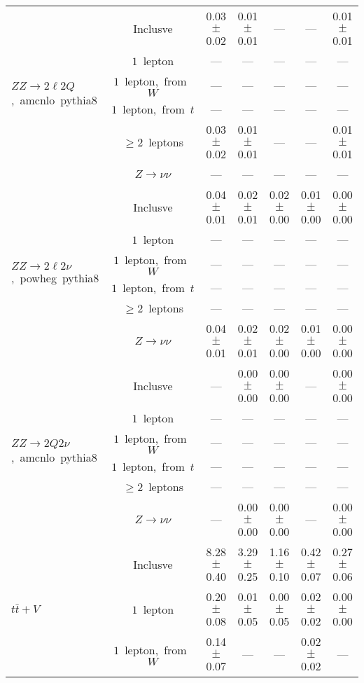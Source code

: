 \documentclass{article}
\begin{document}
\begin{longtable}{|l|c|c|c|c|c|c|}
\hline 
\multirow{6}{*}{$ZZ{\rightarrow}2{\ell}2Q$,~amcnlo~pythia8} & Inclusve  & 0.03 $\pm$ 0.02  & 0.01 $\pm$ 0.01  & ---  & ---  & 0.01 $\pm$ 0.01 \\* 
 & $1$~lepton  & ---  & ---  & ---  & ---  & --- \\* 
 & $1$~lepton,~from~$W$  & ---  & ---  & ---  & ---  & --- \\* 
 & $1$~lepton,~from~$t$  & ---  & ---  & ---  & ---  & --- \\* 
 & $\ge2$~leptons  & 0.03 $\pm$ 0.02  & 0.01 $\pm$ 0.01  & ---  & ---  & 0.01 $\pm$ 0.01 \\* 
 & $Z\rightarrow\nu\nu$  & ---  & ---  & ---  & ---  & --- \\* 
\hline 
\multirow{6}{*}{$ZZ{\rightarrow}2{\ell}2{\nu}$,~powheg~pythia8} & Inclusve  & 0.04 $\pm$ 0.01  & 0.02 $\pm$ 0.01  & 0.02 $\pm$ 0.00  & 0.01 $\pm$ 0.00  & 0.00 $\pm$ 0.00 \\* 
 & $1$~lepton  & ---  & ---  & ---  & ---  & --- \\* 
 & $1$~lepton,~from~$W$  & ---  & ---  & ---  & ---  & --- \\* 
 & $1$~lepton,~from~$t$  & ---  & ---  & ---  & ---  & --- \\* 
 & $\ge2$~leptons  & ---  & ---  & ---  & ---  & --- \\* 
 & $Z\rightarrow\nu\nu$  & 0.04 $\pm$ 0.01  & 0.02 $\pm$ 0.01  & 0.02 $\pm$ 0.00  & 0.01 $\pm$ 0.00  & 0.00 $\pm$ 0.00 \\* 
\hline 
\multirow{6}{*}{$ZZ{\rightarrow}2Q2{\nu}$,~amcnlo~pythia8} & Inclusve  & ---  & 0.00 $\pm$ 0.00  & 0.00 $\pm$ 0.00  & ---  & 0.00 $\pm$ 0.00 \\* 
 & $1$~lepton  & ---  & ---  & ---  & ---  & --- \\* 
 & $1$~lepton,~from~$W$  & ---  & ---  & ---  & ---  & --- \\* 
 & $1$~lepton,~from~$t$  & ---  & ---  & ---  & ---  & --- \\* 
 & $\ge2$~leptons  & ---  & ---  & ---  & ---  & --- \\* 
 & $Z\rightarrow\nu\nu$  & ---  & 0.00 $\pm$ 0.00  & 0.00 $\pm$ 0.00  & ---  & 0.00 $\pm$ 0.00 \\* 
\hline 
\multirow{6}{*}{$t\bar{t}+V$} & Inclusve  & 8.28 $\pm$ 0.40  & 3.29 $\pm$ 0.25  & 1.16 $\pm$ 0.10  & 0.42 $\pm$ 0.07  & 0.27 $\pm$ 0.06 \\* 
 & $1$~lepton  & 0.20 $\pm$ 0.08  & 0.01 $\pm$ 0.05  & 0.00 $\pm$ 0.05  & 0.02 $\pm$ 0.02  & 0.00 $\pm$ 0.00 \\* 
 & $1$~lepton,~from~$W$  & 0.14 $\pm$ 0.07  & ---  & ---  & 0.02 $\pm$ 0.02  & --- \\* 

\end{longtable}
\end{document}
